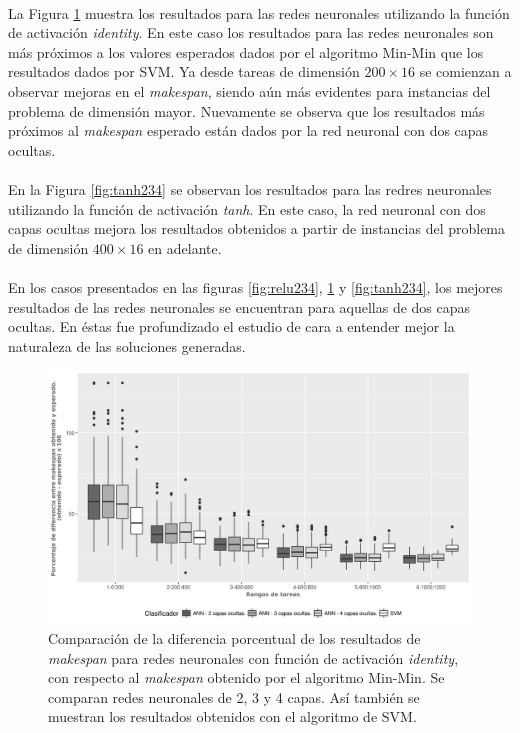 \paragraph{}La Figura \ref{fig:identity234} muestra los resultados para las redes neuronales utilizando la función de activación \textit{identity}.
En este caso los resultados para las redes neuronales son más próximos a los valores esperados dados por el algoritmo Min-Min que los resultados dados por SVM.
Ya desde tareas de dimensión $ 200 \times 16$ se comienzan a observar mejoras en el \textit{makespan}, siendo aún más evidentes para instancias del problema de dimensión mayor.
Nuevamente se observa que los resultados más próximos al \textit{makespan} esperado están dados por la red neuronal con dos capas ocultas. 

\paragraph{}En la Figura \ref{fig:tanh234} se observan los resultados para las redres neuronales utilizando la función de activación \textit{tanh}.
En este caso, la red neuronal con dos capas ocultas mejora los resultados obtenidos a partir de instancias del problema de dimensión $ 400 \times 16$ en adelante. 

\paragraph{}En los casos presentados en las figuras \ref{fig:relu234}, \ref{fig:identity234} y \ref{fig:tanh234}, los mejores resultados de las redes neuronales se encuentran para aquellas de dos capas ocultas.
En éstas fue profundizado el estudio de cara a entender mejor la naturaleza de las soluciones generadas. 

\begin{figure}[H]
  \centering
  \includegraphics[width=\columnwidth]{imagenes/comparacion_anns_identity.png}
  \caption{Comparación de  la diferencia porcentual  de los resultados de \textit{makespan} para redes neuronales con función de activación \textit{identity}, con respecto al \textit{makespan} obtenido por el algoritmo Min-Min.
Se comparan redes neuronales de 2, 3 y 4 capas.
Así también se muestran los resultados obtenidos con el algoritmo de SVM.}
  \label{fig:identity234}
\end{figure}

